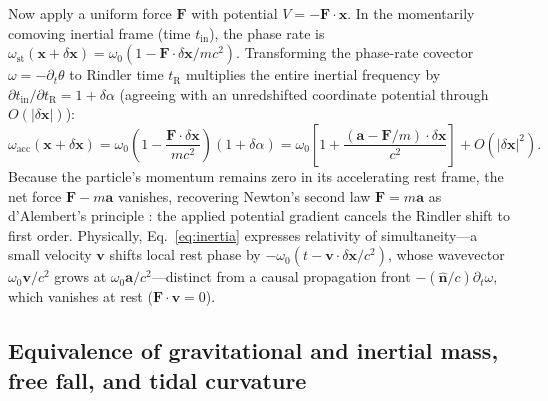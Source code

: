 \documentclass[aps,prd,onecolumn,tightenlines,nofootinbib,notitlepage,10pt,floatfix]{revtex4-2}
\theoremstyle{indentedtheorem}
\begin{document}
Now apply a uniform force $\mathbf{F}$ with potential $V=-\mathbf{F}\cdot\mathbf{x}$. In the momentarily comoving inertial frame (time $t_\text{in}$), the phase rate is $\omega_\text{st}(\mathbf{x}+\delta\mathbf{x})=\omega_0(1-\mathbf{F}\cdot\delta\mathbf{x}/mc^2)$. Transforming the phase-rate covector $\omega=-\partial_t\theta$ to Rindler time $t_\text{R}$ multiplies the entire inertial frequency by $\partial t_\text{in}/\partial t_\text{R}=1+\delta\alpha$ (agreeing with an unredshifted coordinate potential through $O(|\delta\mathbf{x}|)$):
\begin{equation}
    \omega_\text{acc}(\mathbf{x}+\delta\mathbf{x}) = \omega_0 \left(1-\frac{\mathbf{F}\cdot\delta\mathbf{x}}{mc^2}\right) (1+\delta\alpha) = \omega_0\!\left[1+\frac{(\mathbf{a}-\mathbf{F}/m)\cdot\delta\mathbf{x}}{c^2}\right] + O(|\delta\mathbf{x}|^2) .
    \label{eq:flat_total}
\end{equation}
Because the particle's momentum remains zero in its accelerating rest frame, the net force $\mathbf{F}-m\mathbf{a}$ vanishes, recovering Newton's second law $\mathbf{F}=m\mathbf{a}$ as d'Alembert's principle \citep{DAlembert1743Traite,Goldstein2002Classical}: the applied potential gradient cancels the Rindler shift to first order. Physically, Eq.~\eqref{eq:inertia} expresses relativity of simultaneity---a small velocity $\mathbf{v}$ shifts local rest phase by $-\omega_0(t-\mathbf{v}\cdot\delta\mathbf{x}/c^2)$, whose wavevector $\omega_0\mathbf{v}/c^2$ grows at $\omega_0\mathbf{a}/c^2$---distinct from a causal propagation front $-(\hat{\mathbf{n}}/c)\partial_t\omega$, which vanishes at rest ($\mathbf{F}\cdot\mathbf{v}=0$).

\subsection{Equivalence of gravitational and inertial mass, free fall, and tidal curvature}
\label{sec:duality}
\end{document}
